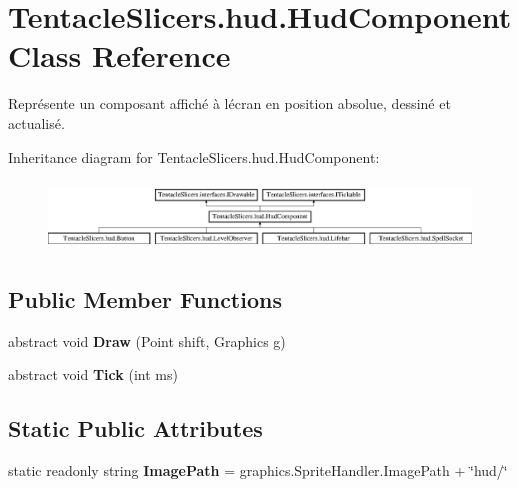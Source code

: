 \hypertarget{class_tentacle_slicers_1_1hud_1_1_hud_component}{}\section{Tentacle\+Slicers.\+hud.\+Hud\+Component Class Reference}
\label{class_tentacle_slicers_1_1hud_1_1_hud_component}


Représente un composant affiché à l\textquotesingle{}écran en position absolue, dessiné et actualisé.  


Inheritance diagram for Tentacle\+Slicers.\+hud.\+Hud\+Component\+:\begin{figure}[H]
\begin{center}
\leavevmode
\includegraphics[height=1.842105cm]{class_tentacle_slicers_1_1hud_1_1_hud_component}
\end{center}
\end{figure}
\subsection*{Public Member Functions}
\begin{DoxyCompactItemize}
\item 
\mbox{\label{class_tentacle_slicers_1_1hud_1_1_hud_component_a40ce9caeb3cd0cdd5528daf56887c075}} 
abstract void {\bfseries Draw} (Point shift, Graphics g)
\item 
\mbox{\label{class_tentacle_slicers_1_1hud_1_1_hud_component_a1b70db22e6d92b5c536e6ac9fe3db754}} 
abstract void {\bfseries Tick} (int ms)
\end{DoxyCompactItemize}
\subsection*{Static Public Attributes}
\begin{DoxyCompactItemize}
\item 
\mbox{\label{class_tentacle_slicers_1_1hud_1_1_hud_component_a669b850fbf61527da376c9e62c74fe09}} 
static readonly string {\bfseries Image\+Path} = graphics.\+Sprite\+Handler.\+Image\+Path + \char`\"{}hud/\char`\"{}
\end{DoxyCompactItemize}

